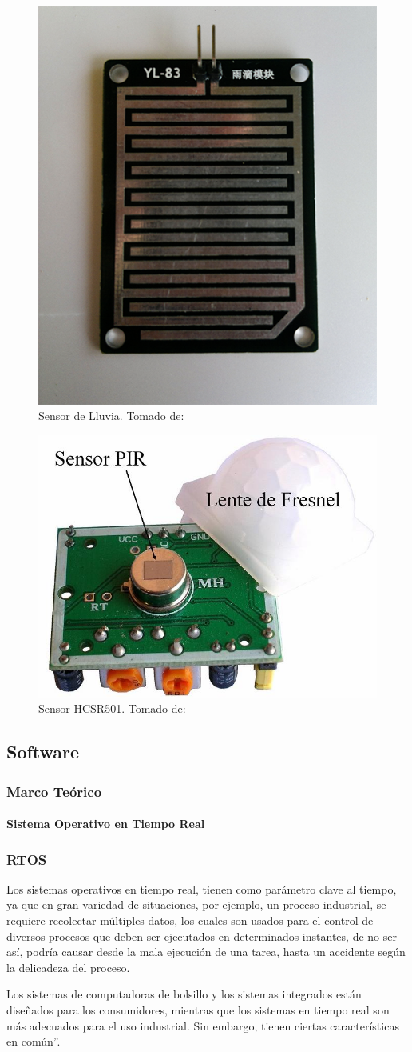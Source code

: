 \begin{frame}
\begin{multicols}{3}
	\begin{figure}[!]
		\centering
		\caption{\tiny Sensor de Lluvia. Tomado de: \cite{LLU}}
		\label{fig:yl-83}
		\includegraphics[width=0.35\linewidth]{Imagenes/YL-83}
	\end{figure}
	
	\begin{figure}[!]
		\centering
		\caption{\tiny Sensor HCSR501. Tomado de: \cite{PIR2}}
		\label{fig:sensor-hc-sr501-1000-m}
		\includegraphics[width=0.5\linewidth]{Imagenes/SENSOR-HC-SR501-1000-M}
	\end{figure}
\end{multicols}

\end{frame}


\subsection{Software}
\begin{frame}
\frametitle{Marco Teórico}
\framesubtitle{Sistema Operativo en Tiempo Real}
\subsubsection{RTOS}

Los sistemas operativos en tiempo real, tienen como parámetro clave al tiempo, ya que en gran variedad de situaciones, por ejemplo, un proceso industrial, se requiere recolectar múltiples datos, los cuales son usados para el control de diversos procesos que deben ser ejecutados en determinados instantes, de no ser así, podría causar desde la mala ejecución de una tarea, hasta un accidente según la delicadeza del proceso.\newline

Los sistemas de computadoras de bolsillo y los sistemas integrados están diseñados para los consumidores, mientras que los sistemas en tiempo real son más adecuados para el uso industrial. Sin embargo, tienen ciertas características en común''. \cite{SO}
\end{frame}

